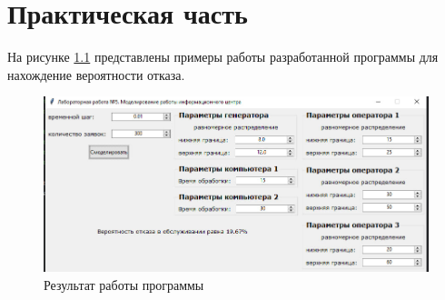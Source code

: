 \chapter{Практическая часть}

На рисунке \ref{img:example-1}  представлены примеры работы разработанной программы для нахождение вероятности отказа.

\begin{figure}[ht!]
	\centering
	\includegraphics[width=0.8\linewidth]{img/res.jpg}
	\caption{Результат работы программы}
	\label{img:example-1}
\end{figure}

